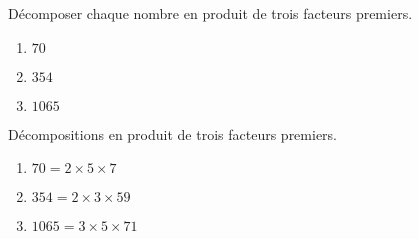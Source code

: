 \begin{exercice*}
    \label{N2exosBase013}
    Décomposer chaque nombre en produit de trois facteurs premiers.
    \begin{enumerate}
        \item $70$
        \item $354$
        \item $\num{1065}$
    \end{enumerate}

\end{exercice*}
\begin{corrige}
    Décompositions en produit de trois facteurs premiers.
    \begin{enumerate}
        \item $70=2\times 5\times 7$
        \item $354=2\times 3\times 59$
        \item $\num{1065}=3\times 5\times 71$
    \end{enumerate} 
\end{corrige}

